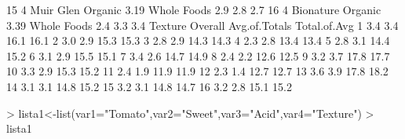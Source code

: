 \documentclass{article}
\begin{document}
\begin{Schunk}
\begin{Soutput}
15     4        Muir Glen Organic  3.19      Whole Foods   2.9  2.8   2.7
16     4        Bionature Organic  3.39      Whole Foods   2.4  3.3   3.4
   Texture Overall Avg.of.Totals Total.of.Avg
1      3.4     3.4          16.1         16.1
2      3.0     2.9          15.3         15.3
3      2.8     2.9          14.3         14.3
4      2.3     2.8          13.4         13.4
5      2.8     3.1          14.4         15.2
6      3.1     2.9          15.5         15.1
7      3.4     2.6          14.7         14.9
8      2.4     2.2          12.6         12.5
9      3.2     3.7          17.8         17.7
10     3.3     2.9          15.3         15.2
11     2.4     1.9          11.9         11.9
12     2.3     1.4          12.7         12.7
13     3.6     3.9          17.8         18.2
14     3.1     3.1          14.8         15.2
15     3.2     3.1          14.8         14.7
16     3.2     2.8          15.1         15.2
\end{Soutput}
\begin{Sinput}
> lista1<-list(var1="Tomato",var2="Sweet",var3="Acid",var4="Texture")
> lista1
\end{Sinput}
\end{Schunk}
\end{document}
